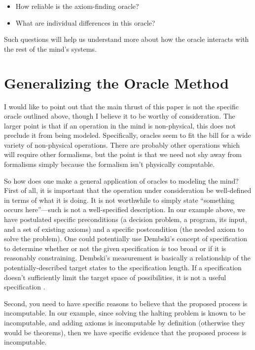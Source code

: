 \begin{itemize}
\item How reliable is the axiom-finding oracle?
\item What are individual differences in this oracle?
\end{itemize}

Such questions will help us understand more about how the oracle interacts with the rest of the mind's systems.

\section{Generalizing the Oracle Method}

I would like to point out that the main thrust of this paper is not the specific oracle outlined above, though I believe it to be worthy of consideration.  The larger point is that if an operation in the mind is non-physical, this does not preclude it from being modeled.  Specifically, oracles seem to fit the bill for a wide variety of non-physical operations.  There are probably other operations which will require other formalisms, but the point is that we need not shy away from formalisms simply because the formalism isn't physically computable.  

So how does one make a general application of oracles to modeling the mind?  First of all, it is important that the operation under consideration be well-defined in terms of what it is doing.  It is not worthwhile to simply state ``something occurs here''---such is not a well-specified description.  In our example above, we have postulated specific preconditions (a decision problem, a program, its input, and a set of existing axioms) and a specific postcondition (the needed axiom to solve the problem).  One could potentially use Dembski's concept of specification to determine whether or not the given specification is too broad or if it is reasonably constraining.  Dembski's measurement is basically a relationship of the potentially-described target states to the specification length.  If a specification doesn't sufficiently limit the target space of possibilities, it is not a useful specification \citep{dembski2005}.  

Second, you need to have specific reasons to believe that the proposed process is incomputable.  In our example, since solving the halting problem is known to be incomputable, and adding axioms is incomputable by definition (otherwise they would be theorems), then we have specific evidence that the proposed process is incomputable.  

